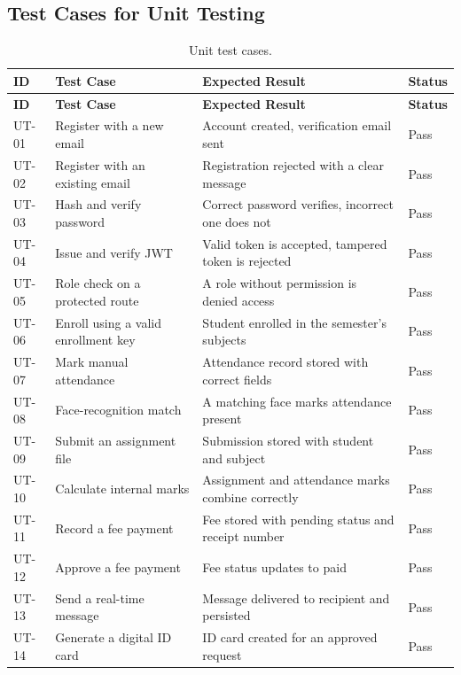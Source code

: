 \documentclass[12pt,a4paper]{report}
\begin{document}
\subsection{Test Cases for Unit Testing}

\begin{longtable}{|p{1.2cm}|p{4.6cm}|p{4.8cm}|p{1.8cm}|}
\caption{Unit test cases.}
\label{tab:unittest}\\
\hline
\textbf{ID} & \textbf{Test Case} & \textbf{Expected Result} & \textbf{Status} \\
\hline
\endfirsthead
\hline
\textbf{ID} & \textbf{Test Case} & \textbf{Expected Result} & \textbf{Status} \\
\hline
\endhead
UT-01 & Register with a new email & Account created, verification email sent & Pass \\
\hline
UT-02 & Register with an existing email & Registration rejected with a clear message & Pass \\
\hline
UT-03 & Hash and verify password & Correct password verifies, incorrect one does not & Pass \\
\hline
UT-04 & Issue and verify JWT & Valid token is accepted, tampered token is rejected & Pass \\
\hline
UT-05 & Role check on a protected route & A role without permission is denied access & Pass \\
\hline
UT-06 & Enroll using a valid enrollment key & Student enrolled in the semester's subjects & Pass \\
\hline
UT-07 & Mark manual attendance & Attendance record stored with correct fields & Pass \\
\hline
UT-08 & Face-recognition match & A matching face marks attendance present & Pass \\
\hline
UT-09 & Submit an assignment file & Submission stored with student and subject & Pass \\
\hline
UT-10 & Calculate internal marks & Assignment and attendance marks combine correctly & Pass \\
\hline
UT-11 & Record a fee payment & Fee stored with pending status and receipt number & Pass \\
\hline
UT-12 & Approve a fee payment & Fee status updates to paid & Pass \\
\hline
UT-13 & Send a real-time message & Message delivered to recipient and persisted & Pass \\
\hline
UT-14 & Generate a digital ID card & ID card created for an approved request & Pass \\
\hline
\end{longtable}
\end{document}

